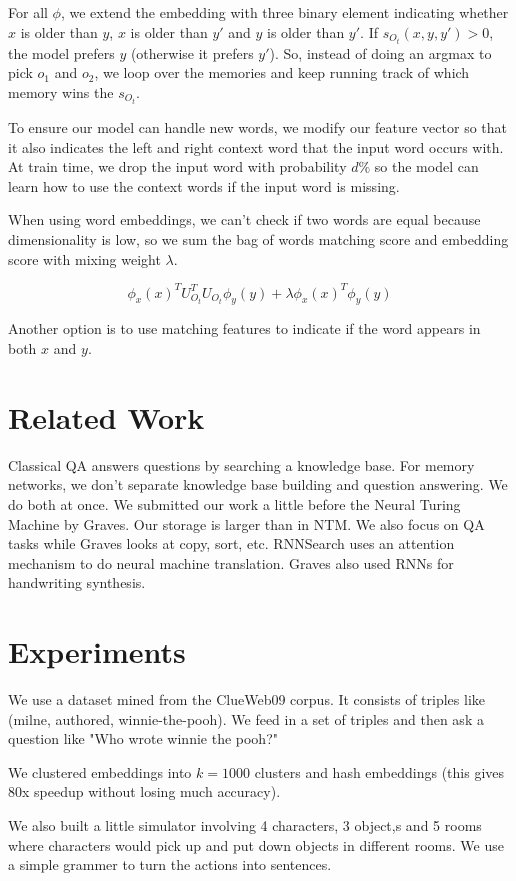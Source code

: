\documentclass[a4paper]{article}
\begin{document}
For all $\phi$, we extend the embedding with three binary element indicating
whether $x$ is older than $y$, $x$ is older than $y'$ and $y$ is older than
$y'$. If $s_{O_t}(x, y, y') > 0$, the model prefers $y$ (otherwise it prefers
$y'$). So, instead of doing an argmax to pick $o_1$ and $o_2$, we loop
over the memories and keep running track of which memory wins the $s_{O_t}$.

To ensure our model can handle new words, we modify our feature vector so that
it also indicates the left and right context word that the input word occurs
with. At train time, we drop the input word with probability $d\%$ so the
model can learn how to use the context words if the input word is missing.

When using word embeddings, we can't check if two words are equal because
dimensionality is low, so we sum the bag of words matching score and embedding
score with mixing weight $\lambda$.

$$
\phi_x(x)^T U_{O_t}^T U_{O_t} \phi_y(y) + \lambda \phi_x(x)^T \phi_y(y)
$$

Another option is to use matching features to indicate if the word appears in
both $x$ and $y$.

\section{Related Work}
Classical QA answers questions by searching a knowledge base. For memory
networks, we don't separate knowledge base building and question answering.
We do both at once. We submitted our work a little before the Neural Turing
Machine by Graves. Our storage is larger than in NTM. We also focus on QA
tasks while Graves looks at copy, sort, etc. RNNSearch uses an attention
mechanism to do neural machine translation. Graves also used RNNs for
handwriting synthesis.

\section{Experiments}
We use a dataset mined from the ClueWeb09 corpus. It consists of triples
like (milne, authored, winnie-the-pooh). We feed in a set of triples
and then ask a question like "Who wrote winnie the pooh?"

We clustered embeddings into $k=1000$ clusters and hash embeddings (this gives
80x speedup without losing much accuracy).

We also built a little simulator involving 4 characters, 3 object,s and 5 rooms
where characters would pick up and put down objects in different rooms. We use
a simple grammer to turn the actions into sentences.
\end{document}
